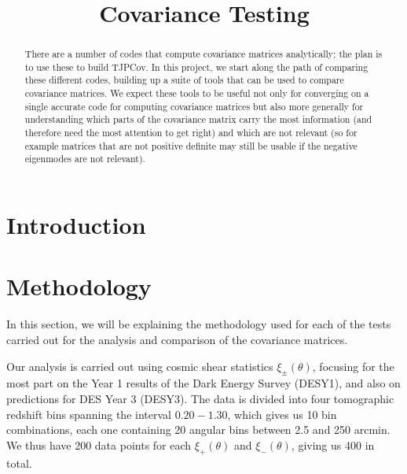 \documentclass[twocolumn]{\docclass}
\begin{document}
	
	\title{Covariance Testing}
	
	\maketitlepre
	
	\begin{abstract}
		
		There  are a number of codes that compute covariance matrices analytically; the plan is to use these to build TJPCov. In this project, we start along the path of comparing these different codes, building up a suite of tools that can be used to compare covariance matrices. We expect these tools to be useful not only for converging on a single accurate code for computing covariance matrices but also more generally for understanding which parts of the covariance matrix carry the most information (and therefore need the most attention to get right) and which are not relevant (so for example matrices that are not positive definite may still be usable if the negative eigenmodes are not relevant).
	\end{abstract}
	
	\dockeys{}
	
	\maketitlepost
	
	
	\section{Introduction}
	\label{sec:intro}
	
	
	
	\section{Methodology}
	\label{sec:methods}
	
	In this section, we will be explaining the methodology used for each of the tests carried out for the analysis and comparison of the covariance matrices. 
	
	Our analysis is carried out using cosmic shear statistics $\xi_\pm(\theta)$, focusing for the most part on the Year 1 results of the Dark Energy Survey \citep{Abbott:2018cms} (DESY1), and also on predictions for DES Year 3 (DESY3). The data is divided into four tomographic redshift bins spanning the interval $0.20 - 1.30$, which gives us 10 bin combinations, each one containing 20 angular bins between 2.5 and 250 arcmin. We thus have 200 data points for each $\xi_+(\theta)$ and $\xi_-(\theta)$, giving us 400 in total. 
	
\end{document}
